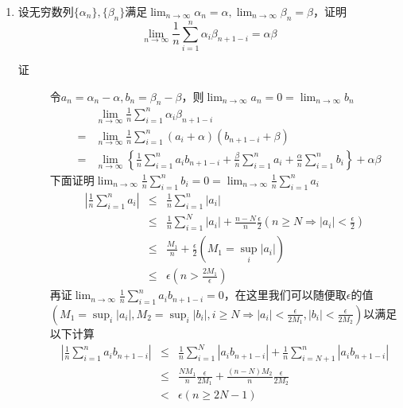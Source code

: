 \begin{enumerate}
\item 设无穷数列$\{\alpha_n\},\{\beta_n\}$满足$\lim_{n \to \infty}\alpha_n =\alpha,\lim_{n \to \infty}\beta_n =\beta$，证明
\[
\lim_{n \to \infty} \frac{1}{n} \sum_{i=1}^n \alpha_i\beta_{n+1-i} = \alpha \beta
\]
\begin{description}
\item[证] 令$a_n=\alpha_n-\alpha,b_n=\beta_n-\beta$，则$\lim_{n\to\infty}a_n=0=\lim_{n\to\infty}b_n$
\begin{eqnarray*}
& &\lim_{n \to \infty} \frac{1}{n} \sum_{i=1}^n \alpha_i\beta_{n+1-i}\\
&=&\lim_{n \to \infty} \frac{1}{n} \sum_{i=1}^n (a_i+\alpha)(b_{n+1-i}+\beta)\\
&=&\lim_{n \to \infty}\left\{\frac{1}{n}\sum_{i=1}^na_ib_{n+1-i}+\frac{\beta}{n}\sum_{i=1}^na_i +\frac{\alpha}{n}\sum_{i=1}^nb_i\right\}+\alpha \beta
\end{eqnarray*}
下面证明$\lim_{n \to \infty}\frac{1}{n}\sum_{i=1}^nb_i=0=\lim_{n \to \infty}\frac{1}{n}\sum_{i=1}^na_i$
\begin{eqnarray*}
\left|\frac{1}{n}\sum_{i=1}^{n}a_i\right|&\leq&\frac{1}{n}\sum_{i=1}^{n}|a_i|\\
&\leq&\frac{1}{n}\sum_{i=1}^{N}|a_i|+\frac{n-N}{n}\frac{\epsilon}{2}(n\geq N\Rightarrow|a_i|<\frac{\epsilon}{2})\\
&\leq&\frac{M_1}{n}+\frac{\epsilon}{2}(M_1=\sup_i|a_i|)\\
&\leq&\epsilon(n>\frac{2M_1}{\epsilon})
\end{eqnarray*}
再证$\lim_{n \to \infty}\frac{1}{n}\sum_{i=1}^na_ib_{n+1-i}=0$，在这里我们可以随便取$\epsilon$的值$(M_1=\sup_i|a_i|,M_2=\sup_i|b_i|,i\geq N\Rightarrow|a_i|<\frac{\epsilon}{2M_1},|b_i|<\frac{\epsilon}{2M_2})$以满足以下计算
\begin{eqnarray*}
\left|\frac{1}{n}\sum_{i=1}^{n}a_ib_{n+1-i}\right|&\leq&\frac{1}{n}\sum_{i=1}^{N}|a_ib_{n+1-i}|+\frac{1}{n}\sum_{i=N+1}^{n}|a_ib_{n+1-i}|\\
&\leq&\frac{NM_1}{n}\frac{\epsilon}{2M_1}+\frac{(n-N)M_2}{n}\frac{\epsilon}{2M_2}\\
&<&\epsilon(n\geq2N-1)
\end{eqnarray*}
\end{description}



\end{enumerate}
